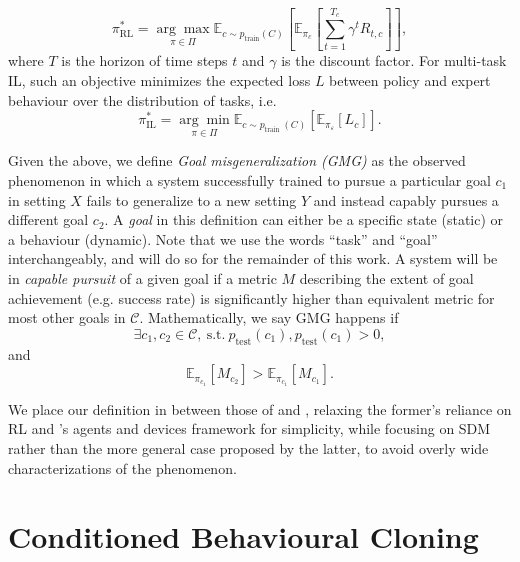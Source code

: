 \documentclass[../main.tex]{subfiles}
\begin{document}
\begin{equation}
	\pi^*_\text{RL} =
	\underset{\pi \in \Pi}{\arg \max } \mathbb{E}_{c \sim p_{\text{train}}(C)}
	\left[\mathbb{E}_{\pi_c}
		\left[\sum_{t=1}^{T_c} \gamma^t R_{t,c}\right]
		\right],
\end{equation}
where $T$ is the horizon of time steps $t$ and $\gamma$ is the discount factor.
For multi-task IL, such an objective minimizes the expected loss $L$ between policy and expert
behaviour over the distribution of tasks, i.e.
\begin{equation}
	\pi^*_\text{IL} =
	\underset{\pi \in \Pi}{\arg \min } \mathbb{E}_{c \sim p_{\text {train }}(C)}
	\left[\mathbb{E}_{\pi_{\varepsilon}}
	\left[L_{c}\right]
	\right].
\end{equation}

Given the above, we define \emph{Goal misgeneralization (GMG)} as the observed phenomenon in which
a system successfully trained to pursue a particular goal $c_1$ in setting $X$ fails to generalize
to a new setting $Y$ and instead capably pursues a different goal $c_2$. A \emph{goal} in this
definition can either be a specific state (static) or a behaviour (dynamic). Note that we use the words ``task'' and ``goal'' interchangeably, and will do so for the remainder of this work. A system will be in
\emph{capable pursuit} of a given goal if a metric $M$ describing the extent of goal achievement
(e.g. success rate) is significantly higher than equivalent metric for most other goals in
$\mathcal{C}$. Mathematically, we say GMG happens if
\begin{equation}
	\exists c_1, c_2 \in \mathcal{C},~\text{s.t.}~p_\text{test}(c_1), p_\text{test}(c_1) > 0,
\end{equation}
and
\begin{equation}
	\mathbb{E}_{\pi_{c_1}}\left[ M_{c_2}\right]>\mathbb{E}_{\pi_{c_1}}\left[M_{c_1}\right].
\end{equation}

We place our definition in between those of \citet{langosco_goal_2022} and \citet{shah_goal_2022},
relaxing the former's reliance on RL and \citet{orseau_agents_2018}'s agents and devices framework
for simplicity, while focusing on SDM rather than the more general case proposed by the latter, to avoid overly wide characterizations of the phenomenon.

\section{Conditioned Behavioural Cloning}
\end{document}
